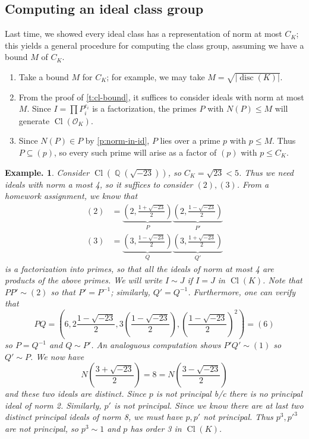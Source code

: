 \documentclass[11pt, a4paper]{memoir}
\DeclareMathOperator{\Q}{{\mathbb{Q}}}
\theoremstyle{change}
\theoremstyle{plain}
\theoremstyle{nonumberplain}
\newtheorem{example}{Example.}
\DeclareMathOperator{\disc}{disc}
\DeclareMathOperator{\Cl}{Cl}
\numberwithin{equation}{section}
\begin{document}
\subsection{Computing an ideal class group}
Last time, we showed every ideal class has a representation of norm at most $C_K$; this yields a general procedure for computing the class group, assuming we have a bound $M$ of $C_K$.
\begin{enumerate}[nl]
    \item Take a bound $M$ for $C_K$; for example, we may take $M=\sqrt{|\disc(K)|}$.
    \item From the proof of \cref{t:cl-bound}, it suffices to consider ideals with norm at most $M$.
        Since $I=\prod P_i^{e_i}$ is a factorization, the primes $P$ with $N(P)\leq M$ will generate $\Cl(\mathcal{O}_K)$.
    \item Since $N(P)\in P$ by \cref{p:norm-in-id}, $P$ lies over a prime $p$ with $p\leq M$.
        Thus $P\subseteq (p)$, so every such prime will arise as a factor of $(p)$ with $p\leq C_K$.
\end{enumerate}
\begin{example}
    Consider $\Cl(\Q(\sqrt{-23}))$, so $C_K=\sqrt{23}<5$.
    Thus we need ideals with norm a most 4, so it suffices to consider $(2),(3)$.
    From a homework assignment, we know that
    \begin{align*}
        (2)&=\underbrace{\left(2,\frac{1+\sqrt{-23}}{2}\right)}_{P}\underbrace{\left(2,\frac{1-\sqrt{-23}}{2}\right)}_{P'}\\
        (3)&=\underbrace{\left(3,\frac{1-\sqrt{-23}}{2}\right)}_{Q}\underbrace{\left(3,\frac{1+\sqrt{-23}}{2}\right)}_{Q'}
    \end{align*}
    is a factorization into primes, so that all the ideals of norm at most 4 are products of the above primes.
    We will write  $I\sim J$ if $I=J$ in $\Cl(K)$.
    Note that $PP'\sim(2)$ so that $P'=P^{-1}$; similarly, $Q'=Q^{-1}$.
    Furthermore, one can verify that
    \begin{equation*}
        PQ=\left(6,2\frac{1-\sqrt{-23}}{2},3\left(\frac{1-\sqrt{-23}}{2}\right),\left(\frac{1-\sqrt{-23}}{2}\right)^2\right)=(6)
    \end{equation*}
    so $P=Q^{-1}$ and $Q\sim P'$.
    An analoguous computation shows $P'Q'\sim(1)$ so $Q'\sim P$.
    We now have
    \begin{equation*}
        N\left(\frac{3+\sqrt{-23}}{2}\right)=8=N\left(\frac{3-\sqrt{-23}}{2}\right)
    \end{equation*}
    and these two ideals are distinct.
    Since $p$ is not principal b/c there is no principal ideal of norm 2.
    Similarly, $p'$ is not principal.
    Since we know there are at last two distinct principal ideals of norm 8, we must have $p,p'$ not principal.
    Thus $p^3,p'^3$ are not principal, so $p^3\sim 1$ and $p$ has order 3 in $\Cl(K)$.
\end{example}
\end{document}
